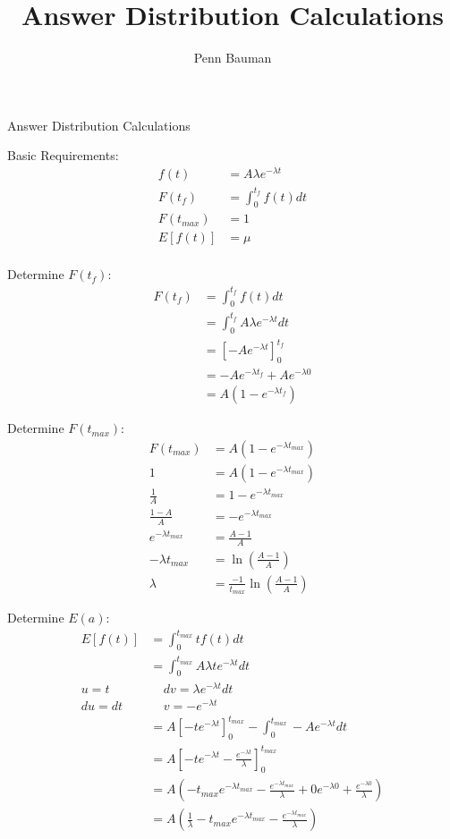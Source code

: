 \documentclass[12pt]{article}
\author{Penn Bauman}
\title{Answer Distribution Calculations}
\begin{document}
Answer Distribution Calculations

Basic Requirements:
\begin{align*}
	f(t) &= A \lambda e^{-\lambda t} \\
	F(t_f) &= \int_{0}^{t_f} f(t) dt \\
	F(t_{max}) &= 1 \\
	E[f(t)] &= \mu \\
\end{align*}

Determine $F(t_f)$:
\begin{align*}
	F(t_f) &= \int_{0}^{t_f} f(t) dt \\
		&= \int_{0}^{t_f} A \lambda e^{-\lambda t} dt \\
		&= \left[-A e^{-\lambda t}\right]_{0}^{t_f} \\
		&= -A e^{-\lambda t_f} + A e^{-\lambda 0} \\
		&= A(1 - e^{-\lambda t_f})
\end{align*}

Determine $F(t_{max})$:
\begin{align*}
	F(t_{max}) &= A(1 - e^{-\lambda t_{max}}) \\
	1 &= A(1 - e^{-\lambda t_{max}}) \\
	\frac{1}{A} &= 1 - e^{-\lambda t_{max}} \\
	\frac{1 - A}{A} &= -e^{-\lambda t_{max}} \\
	e^{-\lambda t_{max}} &= \frac{A - 1}{A} \\
	-\lambda t_{max} &= \ln\left(\frac{A - 1}{A}\right) \\
	\lambda &= \frac{-1}{t_{max}} \ln\left(\frac{A - 1}{A}\right)
\end{align*}

Determine $E(a)$:
\begin{align*}
	E[f(t)] &= \int_{0}^{t_{max}} t f(t) dt \\
		&= \int_{0}^{t_{max}} A \lambda t e^{-\lambda t} dt \\
	u = t\ \ \ \ &\ \ \ \ \ dv = \lambda e^{-\lambda t} dt \\
	du  =  dt \ \ \ \ &\ \ \ \ \ v = -e^{-\lambda t} \\
		&= A\left[-t e^{-\lambda t}\right]_{0}^{t_{max}} - \int_{0}^{t_{max}} -A e^{-\lambda t} dt \\
		&= A\left[-t e^{-\lambda t} - \frac{e^{-\lambda t}}{\lambda}\right]_{0}^{t_{max}} \\
		&= A\left( -t_{max} e^{-\lambda t_{max}} - \frac{e^{-\lambda t_{max}}}{\lambda}
		+ 0 e^{-\lambda 0} + \frac{e^{-\lambda 0}}{\lambda} \right) \\
		&= A \left(\frac{1}{\lambda} - t_{max} e^{-\lambda t_{max}} - \frac{e^{-\lambda t_{max}}}{\lambda}\right) \\
\end{align*}
\end{document}
